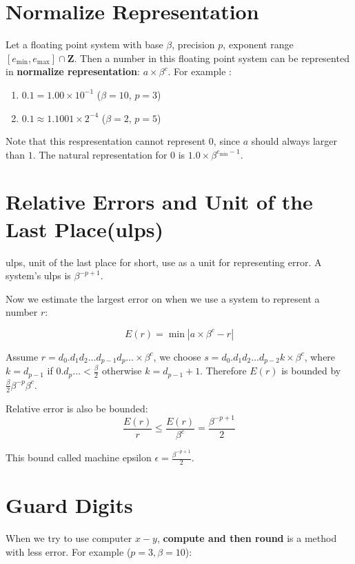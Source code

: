 \section{Normalize Representation}

Let a floating point system with base $\beta$, precision $p$, 
exponent range $[e_{\min}, e_{\max}]\cap\textbf{Z}$. Then a number in this 
floating point system can be represented in 
\textbf{normalize representation}: $a \times \beta^c$.
For example : 

\begin{enumerate}
    \item $0.1 = 1.00 \times 10^{-1}$ ($\beta = 10$, $p = 3$)
    \item $0.1 \approx 1.1001 \times 2^{-4}$ ($\beta = 2$, $p = 5$)
\end{enumerate}

Note that this respresentation cannot represent $0$,
since $a$ should always larger than $1$.
The natural representation for $0$ is $1.0 \times \beta^{e_{\min} - 1}$.

\section{Relative Errors and Unit of the Last Place(ulps)}

ulps, unit of the last place for short, use as a unit for representing error.
A system's ulps is $\beta^{-p+1}$.

Now we estimate the largest error on when we use a system to represent a number $r$:

\[ 
    E(r) = \min|a\times\beta^c - r|
\]

Assume $r = d_0.d_1d_2 \dots d_{p-1}d_p \dots \times \beta^c$,
we choose $s = d_0.d_1d_2 \dots d_{p-2}k \times \beta^c$,
where $k = d_{p-1}$ if $0.d_p \dots < \frac{\beta}{2}$ 
otherwise $k = d_{p-1} + 1$. Therefore $E(r)$ is bounded by $\frac{\beta}{2}\beta^{-p}\beta^c$.

Relative error is also be bounded:
\[
    \frac{E(r)}{r} \leq \frac{E(r)}{\beta^c} = \frac{\beta^{-p+1}}{2}
\]

This bound called machine epsilon $\epsilon = \frac{\beta^{-p+1}}{2}$.

\section{Guard Digits}

When we try to use computer $x - y$,
\textbf{compute and then round} is a method with less error. For example ($p = 3, \beta = 10$):

